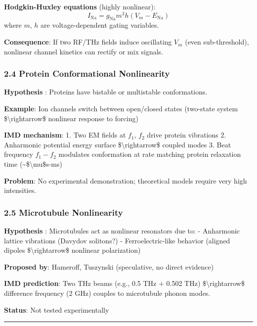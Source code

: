\textbf{Hodgkin-Huxley equations} (highly nonlinear):
\[I_{\text{Na}} = g_{\text{Na}} m^3 h (V_m - E_{\text{Na}})\] where
\(m\), \(h\) are voltage-dependent gating variables.

\textbf{Consequence}: If two RF/THz fields induce oscillating \(V_m\)
(even sub-threshold), nonlinear channel kinetics can rectify or mix
signals.

\subsubsection{2.4 Protein Conformational
Nonlinearity}\label{protein-conformational-nonlinearity}

\textbf{Hypothesis} : Proteins have bistable or multistable
conformations.

\textbf{Example}: Ion channels switch between open/closed states
(two-state system \$\textbackslash rightarrow\$ nonlinear response to
forcing)

\textbf{IMD mechanism}: 1. Two EM fields at \(f_1\), \(f_2\) drive
protein vibrations 2. Anharmonic potential energy surface
\$\textbackslash rightarrow\$ coupled modes 3. Beat frequency
\(f_1 - f_2\) modulates conformation at rate matching protein relaxation
time (\textasciitilde\$\textbackslash mu\$s-ms)

\textbf{Problem}: No experimental demonstration; theoretical models
require very high intensities.

\subsubsection{2.5 Microtubule
Nonlinearity}\label{microtubule-nonlinearity}

\textbf{Hypothesis} : Microtubules act as nonlinear resonators due to: -
Anharmonic lattice vibrations (Davydov solitons?) - Ferroelectric-like
behavior (aligned dipoles \$\textbackslash rightarrow\$ nonlinear
polarization)

\textbf{Proposed by}: Hameroff, Tuszynski (speculative, no direct
evidence)

\textbf{IMD prediction}: Two THz beams (e.g., 0.5 THz + 0.502 THz)
\$\textbackslash rightarrow\$ difference frequency (2 GHz) couples to
microtubule phonon modes.

\textbf{Status}: Not tested experimentally

\begin{center}\rule{0.5\linewidth}{0.5pt}\end{center}

